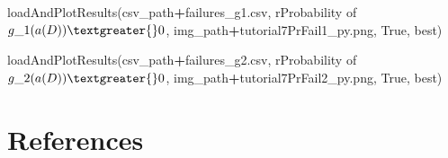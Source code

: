 \documentclass[12pt, twoside]{amherstthesis}
\newenvironment{Shaded}{\begin{snugshade}}{\end{snugshade}}
\newcommand{\NormalTok}[1]{#1}
\newcommand{\OperatorTok}[1]{\textcolor[rgb]{0.81,0.36,0.00}{\textbf{#1}}}
\newcommand{\StringTok}[1]{\textcolor[rgb]{0.31,0.60,0.02}{#1}}
\newcommand{\VariableTok}[1]{\textcolor[rgb]{0.00,0.00,0.00}{#1}}
\newcommand{\VerbatimStringTok}[1]{\textcolor[rgb]{0.31,0.60,0.02}{#1}}
\begin{document}
\begin{Shaded}
\begin{Highlighting}[]
\NormalTok{loadAndPlotResults(csv\_path}\OperatorTok{+}\StringTok{\textquotesingle{}failures\_g1.csv\textquotesingle{}}\NormalTok{,     }
\VerbatimStringTok{r\textquotesingle{}Probability of $g\_1(a(D))\textgreater{}0$\textquotesingle{}}\NormalTok{, }
\NormalTok{img\_path}\OperatorTok{+}\StringTok{\textquotesingle{}tutorial7PrFail1\_py.png\textquotesingle{}}\NormalTok{, }
\VariableTok{True}\NormalTok{,  }
\StringTok{\textquotesingle{}best\textquotesingle{}}\NormalTok{)}
\end{Highlighting}
\end{Shaded}
\begin{Shaded}
\begin{Highlighting}[]
\NormalTok{loadAndPlotResults(csv\_path}\OperatorTok{+}\StringTok{\textquotesingle{}failures\_g2.csv\textquotesingle{}}\NormalTok{,     }
\VerbatimStringTok{r\textquotesingle{}Probability of $g\_2(a(D))\textgreater{}0$\textquotesingle{}}\NormalTok{, }
\NormalTok{img\_path}\OperatorTok{+}\StringTok{\textquotesingle{}tutorial7PrFail2\_py.png\textquotesingle{}}\NormalTok{, }
\VariableTok{True}\NormalTok{,  }
\StringTok{\textquotesingle{}best\textquotesingle{}}\NormalTok{)}
\end{Highlighting}
\end{Shaded}
\backmatter

\hypertarget{references}{%
\chapter*{References}\label{references}}

\noindent

\setlength{\parindent}{-0.20in}
\setlength{\leftskip}{0.20in}
\setlength{\parskip}{8pt}
\end{document}
